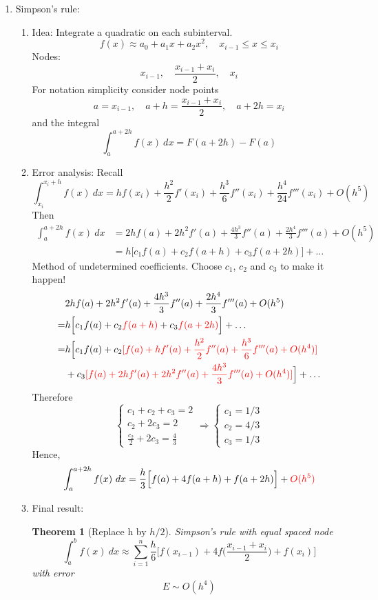 \documentclass{article}
\newtheorem{thm}{Theorem}[section]
\theoremstyle{remark}
\begin{document}
\begin{enumerate}
\item Simpson's rule: 
\begin{enumerate}
\item Idea: Integrate a quadratic on each subinterval.
$$
f(x) \approx a_0+a_1x+a_2x^2,\quad x_{i-1}\leq x\leq x_{i}
$$
Nodes: 
$$
x_{i-1},\quad \frac{x_{i-1}+x_i}{2},\quad x_i
$$
For notation simplicity consider node points
$$
a =  x_{i-1},\quad a+h = \frac{x_{i-1}+x_i}{2}, \quad a + 2h = x_i
$$
and the integral
$$
\int_{a}^{a+2h}f(x)~dx = F(a+2h)-F(a)
$$


\item Error analysis: Recall
$$
\int_{x_i}^{x_i+h}f(x)~dx = h f(x_i) + \frac{h^2}{2}f'(x_i) + \frac{h^3}{6}f''(x_i) + \frac{h^4}{24}f'''(x_i)+ O(h^5)
$$
Then 
\begin{equation*}
\begin{split}
\int_a^{a+2h} f(x)~dx& = 2hf(a) + 2h^2f'(a) + \frac{4h^3}{3}f''(a) + \frac{2h^4}{3}f'''(a)+ O(h^5)\\
& = h\Big[c_1f(a)+c_2f(a+h)+c_3f(a+2h)\Big] + \dots
\end{split}
\end{equation*}
Method of undetermined coefficients. 
Choose $c_1$, $c_2$ and $c_3$ to make it happen!
\begin{equation*}
\begin{split}
& 2hf(a) + 2h^2f'(a) + \frac{4h^3}{3}f''(a) + \frac{2h^4}{3}f'''(a)+ O(h^5)\\
 = & h\Big[c_1f(a)+c_2{\color{red} f(a+h)}+c_3{\color{red} f(a+2h)}\Big] + \dots\\
 = & h\Big[c_1f(a)+c_2{ \color{red} [f(a)+ hf'(a)+\frac{h^2}{2}f''(a)+\frac{h^3}{6}f'''(a)+O(h^4)]}\\
 & +c_3{\color{red} [f(a)+ 2hf'(a)+2h^2f''(a)+\frac{4h^3}{3}f'''(a)+O(h^4)]} \Big] +\dots
\end{split}
\end{equation*}
Therefore
$$
\left\{\begin{array}{l}
c_1 + c_2 + c_3 = 2\\
c_2 + 2c_3 = 2\\
\displaystyle \frac{c_2}{2}+2c_3 = \frac{4}{3}
\end{array}\right.\Rightarrow  \left\{\begin{array}{l}
c_1 = 1/3\\
c_2 = 4/3\\
c_3 = 1/3
\end{array}\right.
$$
Hence,
$$
\int_{a}^{a+2h}f(x)~dx  = \frac{h}{3}\Big[f(a)+ 4f(a+h)+f(a+2h)\Big] + {\color{red} O(h^5)}
$$
\item Final result: 
\begin{thm}[Replace h by $h/2$]
Simpson's rule with equal spaced node
$$
\int_a^b f(x)~dx\approx \sum_{i=1}^n\frac{h}{6}\Big[f(x_{i-1})+4f\Big(\frac{x_{i-1}+x_i}{2}\Big)+f(x_i)\Big]
$$
with error
$$
E \sim O(h^4)
$$
\end{thm}
\end{enumerate}


\end{enumerate}
\end{document}
